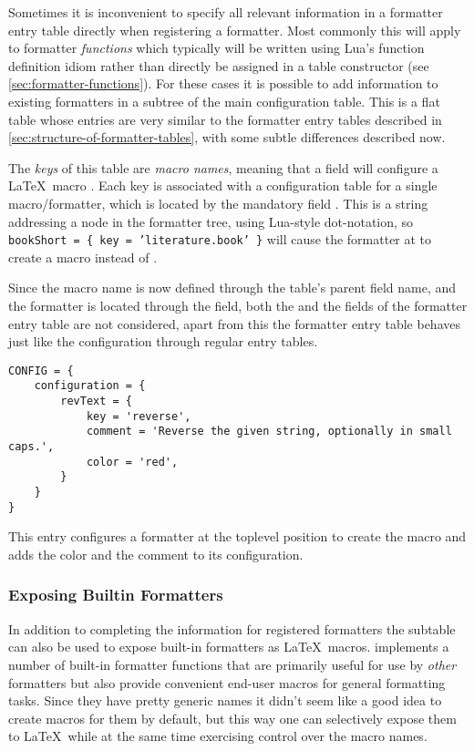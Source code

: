\documentclass{scrartcl}
\begin{document}
Sometimes it is inconvenient to specify all relevant information in a formatter
entry table directly when registering a formatter.  Most commonly this will
apply to formatter \emph{functions} which typically will be written using Lua's
function definition idiom rather than directly be assigned in a table
constructor (see \vref{sec:formatter-functions}).  For these cases it is
possible to add information to existing formatters in a 
subtree of the main configuration table.  This is a flat table whose entries are
very similar to the formatter entry tables described in
\vref{sec:structure-of-formatter-tables}, with some subtle differences described
now.

The \emph{keys} of this table are \emph{macro names}, meaning that a field
 will configure a \LaTeX\ macro
.
Each key is associated with a configuration table for a single macro/formatter,
which is located by the mandatory field .  This is a string
addressing a node in the formatter tree, using Lua-style dot-notation, so
\texttt{bookShort = \{ key = 'literature.book' \}} will cause the formatter at
 to create a macro  instead of
.

Since the macro name is now defined through the table's parent field name, and
the formatter is located through the  field, both the  and
the  fields of the formatter entry table are not considered, apart
from this the formatter entry table behaves just like the configuration through
regular entry tables.

\begin{verbatim}
CONFIG = {
    configuration = {
        revText = {
            key = 'reverse',
            comment = 'Reverse the given string, optionally in small caps.',
            color = 'red',
        }
    }
}
\end{verbatim}

\noindent
This entry configures a formatter at the toplevel position  to
create the macro  and adds the color and the comment to its
configuration.

\subsubsection{Exposing Builtin Formatters}
\label{sec:exposing-builtin-formatters}

In addition to completing the information for registered formatters the
 subtable can also be used to expose built-in formatters
as \LaTeX\ macros.  implements a number of built-in
formatter functions that are primarily useful for use by \emph{other} formatters
but also provide convenient end-user macros for general formatting tasks.  Since
they have pretty generic names it didn't seem like a good idea to create macros
for them by default, but this way one can selectively expose them to \LaTeX\
while at the same time exercising control over the macro names.
\end{document}
